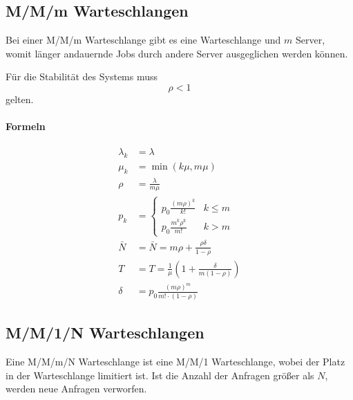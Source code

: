 \documentclass[a4paper, 11pt, accentcolor = tud3b]{tudreport}
\begin{document}
			\subsection{M/M/m Warteschlangen} %
				Bei einer M/M/m Warteschlange gibt es eine Warteschlange und \(m\) Server, womit länger andauernde Jobs durch andere Server ausgeglichen werden können.
				
				Für die Stabilität des Systems muss \[ \rho < 1 \] gelten.
				
				\paragraph{Formeln}
					\begin{align*}
						\lambda _ k & = \lambda              \\
						\mu _ k     & = \min(k\mu, m\mu)     \\
						\rho        & = \frac{\lambda}{m\mu} \\
						p _ k       & = \begin{cases}
							p _ 0 \frac{(m\rho) ^ k}{k!}    & k \leq m \\
							p _ 0 \frac{m ^ k \rho ^ k}{m!} & k > m
						\end{cases} \\
						\bar{N}     & = \bar{N} = m\rho + \frac{\rho\delta}{1 - \rho}      \\
						T           & = T = \frac{1}{\mu} (1 + \frac{\delta}{m(1 - \rho)}) \\
						\delta      & = p _ 0 \frac{(m\rho) ^ m}{m! \cdot (1 - \rho)}
					\end{align*}
			
			\subsection{M/M/1/N Warteschlangen} %
				Eine M/M/m/N Warteschlange ist eine M/M/1 Warteschlange, wobei der Platz in der Warteschlange limitiert ist. Ist die Anzahl der Anfragen größer als \(N\), werden neue Anfragen verworfen.
				
\end{document}
